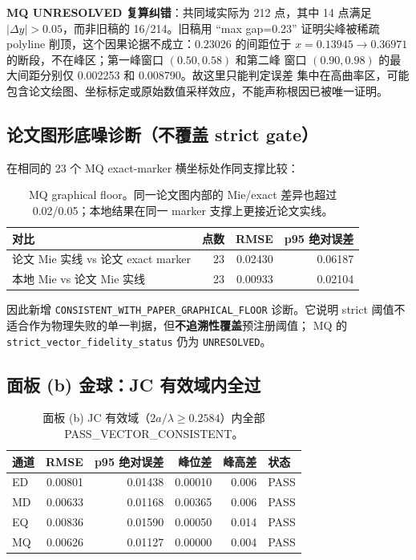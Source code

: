 \textbf{MQ UNRESOLVED 复算纠错}：共同域实际为 212 点，其中 14 点满足
$|\Delta y|>0.05$，而非旧稿的 16/214。旧稿用 ``max gap=0.23'' 证明尖峰被稀疏
polyline 削顶，这个因果论据不成立：0.23026 的间距位于
$x=0.13945\to0.36971$ 的断段，不在峰区；第一峰窗口 $(0.50,0.58)$ 和第二峰
窗口 $(0.90,0.98)$ 的最大间距分别仅 0.002253 和 0.008790。故这里只能判定误差
集中在高曲率区，可能包含论文绘图、坐标标定或原始数值采样效应，不能声称根因已被唯一证明。

\subsection{论文图形底噪诊断（不覆盖 strict gate）}

在相同的 23 个 MQ exact-marker 横坐标处作同支撑比较：

\begin{table}[H]
\centering
\begin{tabular}{lrrr}
\toprule
对比 & 点数 & RMSE & p95 绝对误差 \\
\midrule
论文 Mie 实线 vs 论文 exact marker & 23 & 0.02430 & 0.06187 \\
本地 Mie vs 论文 Mie 实线 & 23 & 0.00933 & 0.02104 \\
\bottomrule
\end{tabular}
\caption{MQ graphical floor。同一论文图内部的 Mie/exact 差异也超过 0.02/0.05；本地结果在同一 marker 支撑上更接近论文实线。}
\end{table}

因此新增 \texttt{CONSISTENT\_WITH\_PAPER\_GRAPHICAL\_FLOOR} 诊断。它说明
strict 阈值不适合作为物理失败的单一判据，但\textbf{不追溯性覆盖}预注册阈值；
MQ 的 \texttt{strict\_vector\_fidelity\_status} 仍为 \texttt{UNRESOLVED}。

\subsection{面板 (b) 金球：JC 有效域内全过}

\begin{table}[H]
\centering
\begin{tabular}{lrrrrl}
\toprule
通道 & RMSE & p95 绝对误差 & 峰位差 & 峰高差 & 状态 \\
\midrule
ED & 0.00801 & 0.01438 & 0.00010 & 0.006 & PASS \\
MD & 0.00633 & 0.01168 & 0.00365 & 0.006 & PASS \\
EQ & 0.00836 & 0.01590 & 0.00050 & 0.014 & PASS \\
MQ & 0.00626 & 0.01127 & 0.00000 & 0.004 & PASS \\
\bottomrule
\end{tabular}
\caption{面板 (b) JC 有效域（$2a/\lambda \geq 0.2584$）内全部 PASS\_VECTOR\_CONSISTENT。}
\end{table}

